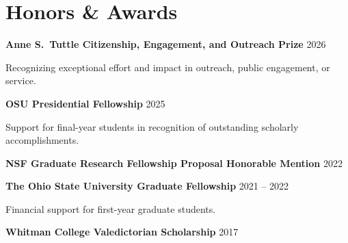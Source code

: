 \section*{Honors \& Awards}

\noindent
{\bf Anne S.\ Tuttle Citizenship, Engagement, and Outreach Prize}
\hfill 2026

Recognizing exceptional effort and impact in outreach, public engagement, or service.


\noindent
{\bf OSU Presidential Fellowship}
\hfill 2025

Support for final-year students in recognition of outstanding scholarly accomplishments.

\noindent
{\bf NSF Graduate Research Fellowship Proposal Honorable Mention}
\hfill 2022

\noindent
{\bf The Ohio State University Graduate Fellowship }
\hfill 2021 -- 2022

Financial support for first-year graduate students.

\noindent 
{\bf Whitman College Valedictorian Scholarship} \hfill 2017




